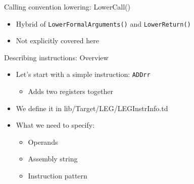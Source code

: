\begin{frame}{Calling convention lowering: LowerCall()}

\begin{itemize}
    \item Hybrid of \texttt{LowerFormalArguments()} and \texttt{LowerReturn()}
    \item Not explicitly covered here
\end{itemize}

\end{frame}



\begin{frame}{Describing instructions: Overview}

\begin{itemize}
    \item Let's start with a simple instruction: \texttt{ADDrr}
    \begin{itemize}
        \item Adds two registers together
    \end{itemize}
    \item We define it in lib/Target/LEG/LEGInstrInfo.td
    \item What we need to specify:
    \begin{itemize}
        \item Operands
        \item Assembly string
        \item Instruction pattern
    \end{itemize}
\end{itemize}

\end{frame}


